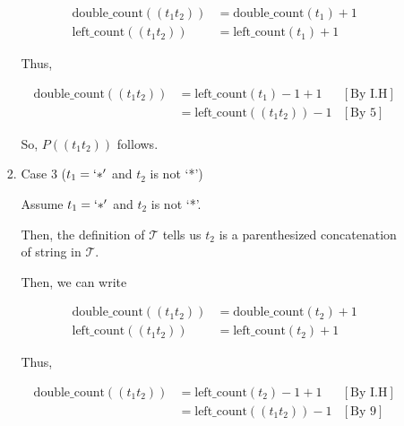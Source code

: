 \documentclass[12pt]{article}
\begin{document}
\begin{enumerate}[a.]
\begin{mdframed}
\begin{enumerate}[1.]
\begin{mdframed}
\begin{enumerate}[1.]
\begin{mdframed}
            \begin{align}
                \text{double\_count}((t_1t_2)) &= \text{double\_count}(t_1) + 1\\
                \text{left\_count}((t_1t_2)) &= \text{left\_count}(t_1) + 1
            \end{align}

            \bigskip

            Thus,

            \begin{align}
                \text{double\_count}((t_1t_2)) &= \text{left\_count}(t_1) - 1 + 1 & [\text{By I.H}]\\
                &= \text{left\_count}((t_1t_2)) - 1 & [\text{By 5}]
            \end{align}

            \bigskip

            So, $P((t_1t_2))$ follows.

            \end{mdframed}

            \item Case 3 ($t_1 = `*'$ and $t_2$ is not `*')

            \begin{mdframed}
            Assume $t_1 = `*'$ and $t_2$ is not `*'.

            \bigskip

            Then, the definition of $\mathcal{T}$ tells us $t_2$ is a parenthesized
            concatenation of string in $\mathcal{T}$.

            \bigskip

            Then, we can write

            \bigskip

            \begin{align}
                \text{double\_count}((t_1t_2)) &= \text{double\_count}(t_2) + 1\\
                \text{left\_count}((t_1t_2)) &= \text{left\_count}(t_2) + 1
            \end{align}

            \bigskip

            Thus,

            \begin{align}
                \text{double\_count}((t_1t_2)) &= \text{left\_count}(t_2) - 1 + 1 & [\text{By I.H}]\\
                &= \text{left\_count}((t_1t_2)) - 1 & [\text{By 9}]
            \end{align}


\end{mdframed}
\end{enumerate}
\end{mdframed}
\end{enumerate}
\end{mdframed}
\end{enumerate}
\end{document}
